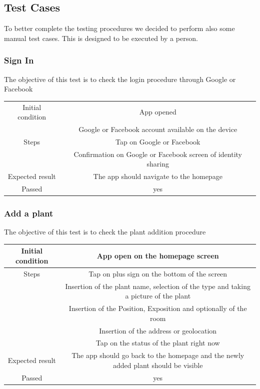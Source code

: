 \documentclass[10pt]{article}
\begin{document}
    \subsection{Test Cases}
    To better complete the testing procedures we decided to perform also some manual test cases. This is designed to be executed by a person.
    \subsubsection{Sign In}
    The objective of this test is to check the login procedure through Google or Facebook
    \begin{center}
    	\begin{tabular}{ |c|c| } 
    		\hline
    		Initial condition & App opened\\
    		 & Google or Facebook account available on the device\\
    		\hline
    		Steps & Tap on Google or Facebook\\
    		 & Confirmation on Google or Facebook screen of identity sharing\\
    		\hline
    		Expected result & The app should navigate to the homepage\\
    		\hline
    		Passed & yes\\
    		\hline
    	\end{tabular}
    \end{center}
	\subsubsection{Add a plant}
	The objective of this test is to check the plant addition procedure
	\begin{center}
		\begin{tabular}{ |c|c| } 
			\hline
			Initial condition & App open on the homepage screen\\
			\hline
			Steps & Tap on plus sign on the bottom of the screen\\
			& Insertion of the plant name, selection of the type and taking a picture of the plant\\
			& Insertion of the Position, Exposition and optionally of the room\\
			& Insertion of the address or geolocation\\
			& Tap on the status of the plant right now\\
			\hline
			Expected result & The app should go back to the homepage and the newly added plant should be visible\\
			\hline
			Passed & yes\\
			\hline
		\end{tabular}
	\end{center}
\end{document}
